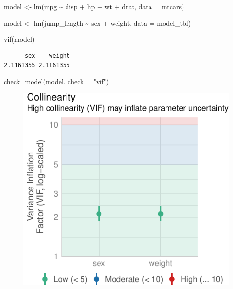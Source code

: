 \documentclass[
  letterpaper,
]{scrbook}
\newenvironment{Shaded}{\begin{snugshade}}{\end{snugshade}}
\newcommand{\AttributeTok}[1]{\textcolor[rgb]{0.40,0.45,0.13}{#1}}
\newcommand{\FunctionTok}[1]{\textcolor[rgb]{0.28,0.35,0.67}{#1}}
\newcommand{\NormalTok}[1]{\textcolor[rgb]{0.00,0.23,0.31}{#1}}
\newcommand{\OtherTok}[1]{\textcolor[rgb]{0.00,0.23,0.31}{#1}}
\newcommand{\SpecialCharTok}[1]{\textcolor[rgb]{0.37,0.37,0.37}{#1}}
\newcommand{\StringTok}[1]{\textcolor[rgb]{0.13,0.47,0.30}{#1}}
\begin{document}
\begin{Shaded}
\begin{Highlighting}[]
\NormalTok{model }\OtherTok{\textless{}{-}} \FunctionTok{lm}\NormalTok{(mpg }\SpecialCharTok{\textasciitilde{}}\NormalTok{ disp }\SpecialCharTok{+}\NormalTok{ hp }\SpecialCharTok{+}\NormalTok{ wt }\SpecialCharTok{+}\NormalTok{ drat, }\AttributeTok{data =}\NormalTok{ mtcars)}

\NormalTok{model }\OtherTok{\textless{}{-}} \FunctionTok{lm}\NormalTok{(jump\_length }\SpecialCharTok{\textasciitilde{}}\NormalTok{ sex }\SpecialCharTok{+}\NormalTok{ weight, }\AttributeTok{data =}\NormalTok{ model\_tbl)}

\FunctionTok{vif}\NormalTok{(model)}
\end{Highlighting}
\end{Shaded}

\begin{verbatim}
      sex    weight 
2.1161355 2.1161355 
\end{verbatim}

\begin{Shaded}
\begin{Highlighting}[]
\FunctionTok{check\_model}\NormalTok{(model, }\AttributeTok{check =} \StringTok{"vif"}\NormalTok{)}
\end{Highlighting}
\end{Shaded}

\begin{figure}[H]

{\centering \includegraphics{./stat-modeling-basic_files/figure-pdf/unnamed-chunk-34-1.pdf}

}

\end{figure}
\end{document}
